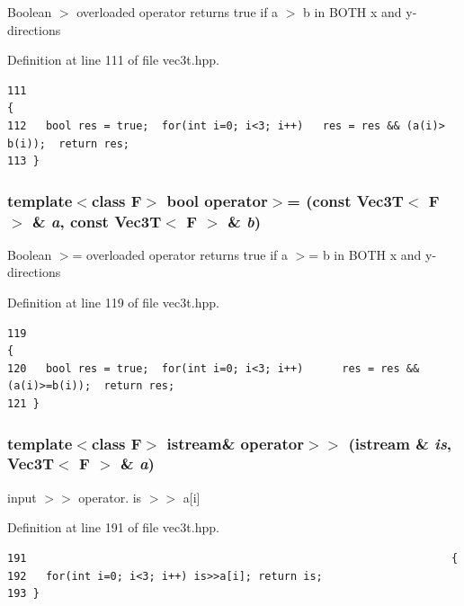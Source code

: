 Boolean $>$ overloaded operator returns true if a $>$ b in BOTH x and y-directions 

Definition at line 111 of file vec3t.hpp.

\footnotesize\begin{verbatim}111                                                                                 {
112   bool res = true;  for(int i=0; i<3; i++)   res = res && (a(i)> b(i));  return res; 
113 }
\end{verbatim}\normalsize 


\subsubsection{\setlength{\rightskip}{0pt plus 5cm}template$<$class F$>$ bool operator$>$= (const {\bf Vec3T}$<$ F $>$ \& {\em a}, const {\bf Vec3T}$<$ F $>$ \& {\em b})\hspace{0.3cm}{\tt  [inline]}}\label{vec3t_8hpp_85d7fc41b6ec5e0faaf89b076c9c5c89_85d7fc41b6ec5e0faaf89b076c9c5c89}


Boolean $>$= overloaded operator returns true if a $>$= b in BOTH x and y-directions 

Definition at line 119 of file vec3t.hpp.

\footnotesize\begin{verbatim}119                                                                                 {
120   bool res = true;  for(int i=0; i<3; i++)      res = res && (a(i)>=b(i));  return res; 
121 }
\end{verbatim}\normalsize 


\subsubsection{\setlength{\rightskip}{0pt plus 5cm}template$<$class F$>$ istream\& operator$>$$>$ (istream \& {\em is}, {\bf Vec3T}$<$ F $>$ \& {\em a})}\label{vec3t_8hpp_e56ca0d9e03cb4b2f3a183f48d3f75a7_e56ca0d9e03cb4b2f3a183f48d3f75a7}


input $>$$>$ operator. is $>$$>$ a[i] 

Definition at line 191 of file vec3t.hpp.

\footnotesize\begin{verbatim}191                                                                  {
192   for(int i=0; i<3; i++) is>>a[i]; return is;
193 }
\end{verbatim}\normalsize 


